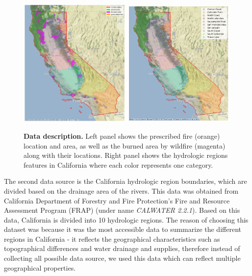 \documentclass{article}
\begin{document}
\begin{figure}[t!]
  \centering
\includegraphics[width=0.49\textwidth]{latex_template/figs/prescribed_0.png}
\includegraphics[width=0.49\textwidth]{figs/HRarea_1.png}
\caption{\textbf{Data description.} Left panel shows the prescribed fire (orange) location and area, as well as the burned area by wildfire (magenta) along with their locations. Right panel shows the hydrologic regions features in California where each color represents one category. }
\label{fig:data}
\end{figure}




The second data source is the California hydrologic region boundaries, which are divided based on the drainage area of the rivers. This data was obtained from California Department of Forestry and Fire Protection's Fire and Resource Assessment Program (FRAP) (under name \textit{CALWATER 2.2.1}). Based on this data, California is divided into 10 hydrologic regions. The reason of choosing this dataset was because it was the most accessible data to summarize the different regions in California - it reflects the geographical characteristics such as topographical differences and water drainage and supplies, therefore instead of collecting all possible data source, we used this data which can reflect multiple geographical properties. 
\end{document}
